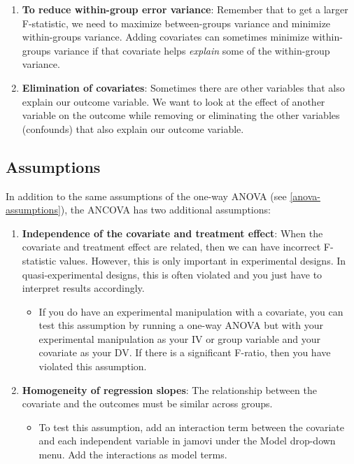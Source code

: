 \documentclass[
]{book}
\providecommand{\tightlist}{%
  \setlength{\itemsep}{0pt}\setlength{\parskip}{0pt}}
\begin{document}
\begin{enumerate}
\def\labelenumi{\arabic{enumi}.}
\item
  \textbf{To reduce within-group error variance}: Remember that to get a larger F-statistic, we need to maximize between-groups variance and minimize within-groups variance. Adding covariates can sometimes minimize within-groups variance if that covariate helps \emph{explain} some of the within-group variance.
\item
  \textbf{Elimination of covariates}: Sometimes there are other variables that also explain our outcome variable. We want to look at the effect of another variable on the outcome while removing or eliminating the other variables (confounds) that also explain our outcome variable.
\end{enumerate}

\hypertarget{assumptions-5}{%
\subsection{Assumptions}\label{assumptions-5}}

In addition to the same assumptions of the one-way ANOVA (see \ref{anova-assumptions}), the ANCOVA has two additional assumptions:

\begin{enumerate}
\def\labelenumi{\arabic{enumi}.}
\item
  \textbf{Independence of the covariate and treatment effect}: When the covariate and treatment effect are related, then we can have incorrect F-statistic values. However, this is only important in experimental designs. In quasi-experimental designs, this is often violated and you just have to interpret results accordingly.

  \begin{itemize}
  \tightlist
  \item
    If you do have an experimental manipulation with a covariate, you can test this assumption by running a one-way ANOVA but with your experimental manipulation as your IV or group variable and your covariate as your DV. If there is a significant F-ratio, then you have violated this assumption.
  \end{itemize}
\item
  \textbf{Homogeneity of regression slopes}: The relationship between the covariate and the outcomes must be similar across groups.

  \begin{itemize}
  \tightlist
  \item
    To test this assumption, add an interaction term between the covariate and each independent variable in jamovi under the Model drop-down menu. Add the interactions as model terms.
  \end{itemize}
\end{enumerate}
\end{document}
